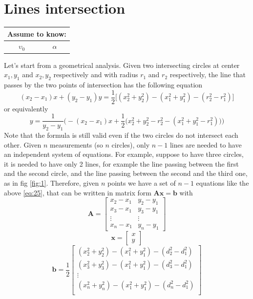 \documentclass[12pt]{report}
\begin{document}
\section{Lines intersection}
\begin{center}
    \begin{tabular}{ |c|c| } 
    \hline
    \multicolumn{2}{|c|}{ \textbf{Assume to know:} } \\
    \hline
    $\upsilon_0$ & $\alpha$ \\
    \hline
    \end{tabular}
\end{center}
Let's start from a geometrical analysis. Given two intersecting circles at center $x_{1},y_{1}$ and $x_{2},y_{2}$ respectively and with radius $r_1$ and $r_2$ respectively, the line that passes by the two points of intersection has the following equation \cite{rzk}
\begin{equation}
    (x_2-x_1)x+(y_2-y_1)y=\frac{1}{2}\big[(x_2^2+y_2^2)-(x_1^2+y_1^2)-(r_2^2-r_1^2)\big]
    \label{eq:25}
\end{equation}
or equivalently
\begin{equation}
    y=\frac{1}{y_2-y_1}\bigg(-(x_2-x_1)x+\frac{1}{2}\big(x_2^2+y_2^2-r_2^2-(x_1^2+y_1^2-r_1^2)\big)\bigg)
\end{equation}
Note that the formula is still valid even if the two circles do not intersect each other.
Given $n$ measurements (so $n$ circles), only $n-1$ lines are needed to have an independent system of equations. For example, suppose to have three circles, it is needed to have only 2 lines, for example the line passing between the first and the second circle, and the line passing between the second and the third one, as in fig \ref{fig:1}.
Therefore, given $n$ points we have a set of $n-1$ equations like the above \eqref{eq:25}, that can be written in matrix form $\mathbf{Ax}=\mathbf{b}$ with
$$\mathbf{A}=\begin{bmatrix}
x_2-x_1&y_2-y_1\\
x_3-x_1&y_3-y_1\\
\vdots&\vdots\\
x_n-x_1&y_n-y_1
\end{bmatrix}$$
$$\mathbf{x}=\begin{bmatrix}
x\\
y
\end{bmatrix}$$
$$\mathbf{b}=\frac{1}{2}\begin{bmatrix}
(x^2_2+y^2_2)-(x_1^2+y^2_1)-(d_2^2-d_1^2)\\
(x^2_3+y^2_3)-(x_1^2+y^2_1)-(d_3^2-d_1^2)\\
\vdots\\
(x^2_n+y^2_n)-(x_1^2+y^2_1)-(d_n^2-d_1^2)\\
\end{bmatrix}$$
\end{document}
